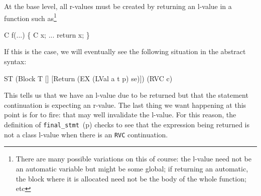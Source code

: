 \documentclass[11pt]{article}
\begin{document}
At the base level, all r-values must be created by returning an
l-value in a function such as\footnote{There are many possible
  variations on this of course: the l-value need not be an automatic
  variable but might be some global; if returning an automatic, the
  block where it is allocated need not be the body of the whole
  function; etc}
\begin{stdrule}
   C f(...)
   \{
     C x;
     ...
     return x;
   \}
\end{stdrule}
If this is the case, we will eventually see the following situation in
the abstract syntax:
\begin{stdrule}
   ST (Block T [] [Return (EX (LVal a t p) se)]) (RVC c)
\end{stdrule}
This tells us that we have an l-value due to be returned but that the
statement continuation is expecting an r-value.  The last thing we
want happening at this point is for
 to fire: that may well
invalidate the l-value.  For this reason, the definition of
\texttt{final_stmt}~(p\pageref{def:final-stmt}) checks to see that the
expression being returned is not a class l-value when there is an
\texttt{RVC} continuation.
\end{document}
